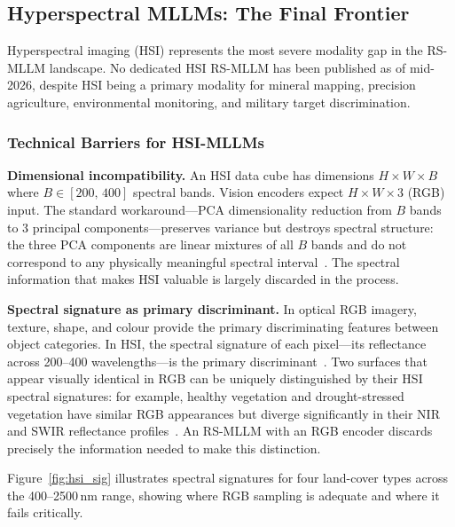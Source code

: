 \subsection{Hyperspectral MLLMs: The Final Frontier}\label{sec5:hsi}

Hyperspectral imaging (HSI) represents the most severe modality gap in the
RS-MLLM landscape. No dedicated HSI RS-MLLM has been published as of mid-2026,
despite HSI being a primary modality for mineral mapping, precision agriculture,
environmental monitoring, and military target discrimination.

\subsubsection{Technical Barriers for HSI-MLLMs}\label{sec5:hsibarriers}

\textbf{Dimensional incompatibility.}
An HSI data cube has dimensions $H\!\times\!W\!\times\!B$ where $B \in [200,\,400]$
spectral bands. Vision encoders expect $H\!\times\!W\!\times\!3$ (RGB) input.
The standard workaround---PCA dimensionality reduction from $B$ bands to 3
principal components---preserves variance but destroys spectral structure: the
three PCA components are linear mixtures of all $B$ bands and do not correspond
to any physically meaningful spectral interval~\cite{bioucas2013hyperspectral}.
The spectral information that makes HSI valuable is largely discarded in the
process.

\textbf{Spectral signature as primary discriminant.}
In optical RGB imagery, texture, shape, and colour provide the primary
discriminating features between object categories. In HSI, the spectral signature
of each pixel---its reflectance across 200--400 wavelengths---is the primary
discriminant~\cite{chen2014spectral}. Two surfaces that appear visually identical
in RGB can be uniquely distinguished by their HSI spectral signatures: for example,
healthy vegetation and drought-stressed vegetation have similar RGB appearances
but diverge significantly in their NIR and SWIR reflectance
profiles~\cite{yokoya2018hyperspectral}. An RS-MLLM with an RGB encoder discards
precisely the information needed to make this distinction.

Figure~\ref{fig:hsi_sig} illustrates spectral signatures for four land-cover
types across the 400--2500\,nm range, showing where RGB sampling is adequate
and where it fails critically.

